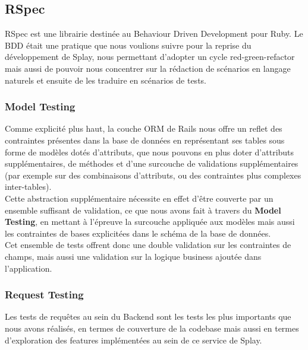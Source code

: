 \documentclass{eplmastersthesis}
\begin{document}
      \subsection{RSpec}

        RSpec est une librairie destinée au Behaviour Driven Development
        pour Ruby. Le BDD était une pratique que nous voulions suivre pour
        la reprise du développement de Splay, nous permettant d'adopter
        un cycle red-green-refactor mais aussi de pouvoir nous concentrer sur
        la rédaction de scénarios en langage naturels et ensuite de les
        traduire en scénarios de tests.

        \subsubsection{Model Testing}

          Comme explicité plus haut, la couche ORM de Rails nous offre un
          reflet des contraintes présentes dans la base de données en représentant
          ses tables sous forme de modèles dotés d'attributs, que nous pouvons en
          plus doter d'attributs supplémentaires, de méthodes et d'une surcouche
          de validations supplémentaires (par exemple sur des combinaisons d'attributs,
          ou des contraintes plus complexes inter-tables).\\

          Cette abstraction supplémentaire nécessite en effet d'être couverte par
          un ensemble suffisant de validation, ce que nous avons fait à travers
          du \textbf{Model Testing}, en mettant à l'épreuve la surcouche appliquée
          aux modèles mais aussi les contraintes de bases explicitées dans le
          schéma de la base de données.\\

          Cet ensemble de tests offrent donc une double validation sur les contraintes
          de champs, mais aussi une validation sur la logique business ajoutée
          dans l'application.

        \subsubsection{Request Testing}

          Les tests de requêtes au sein du Backend sont les tests les plus
          importants que nous avons réalisés, en termes de couverture de la
          codebase mais aussi en termes d'exploration des features implémentées
          au sein de ce service de Splay.\\
\end{document}
